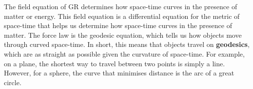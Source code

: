 \documentclass[11pt]{article}
\begin{document}
\newline
\newline
The field equation of GR determines how space-time curves in the presence of matter or energy. This field equation is a differential equation for the metric of space-time that helps us determine how space-time curves in the presence of matter. 
\newline
\newline
The force law is the geodesic equation, which tells us how objects move through curved space-time. In short, this means that objects travel on \textbf{geodesics}, which are as straight as possible given the curvature of space-time. For example, on a plane, the shortest way to travel between two points is simply a line. However, for a sphere, the curve that minimises distance is the arc of a great circle. 
\end{document}
